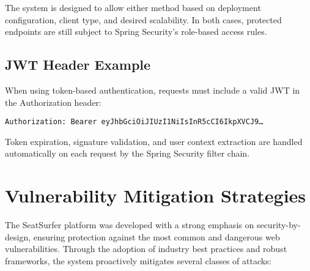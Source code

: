 \documentclass[12pt,a4paper]{report}
\begin{document}
The system is designed to allow either method based on deployment configuration, client type, and desired scalability. In both cases, protected endpoints are still subject to Spring Security's role-based access rules.

\subsection*{JWT Header Example}

When using token-based authentication, requests must include a valid JWT in the Authorization header:

\begin{verbatim}
Authorization: Bearer eyJhbGciOiJIUzI1NiIsInR5cCI6IkpXVCJ9…
\end{verbatim}

Token expiration, signature validation, and user context extraction are handled automatically on each request by the Spring Security filter chain.

\section{Vulnerability Mitigation Strategies}

The SeatSurfer platform was developed with a strong emphasis on security-by-design, ensuring protection against the most common and dangerous web vulnerabilities. Through the adoption of industry best practices and robust frameworks, the system proactively mitigates several classes of attacks:
\end{document}
